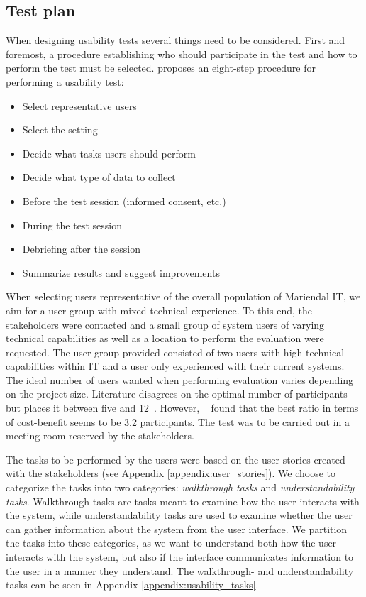 \subsection{Test plan}\label{sec:prototype_test_plan}
When designing usability tests several things need to be considered.
First and foremost, a procedure establishing who should participate in the test and how to perform the test must be selected.
\citeauthor{lazar2005web} \cite{lazar2005web,researchmethodsinhumancomputerinteraction} proposes an eight-step procedure for performing a usability test:
\begin{itemize}
\item Select representative users
\item Select the setting
\item Decide what tasks users should perform
\item Decide what type of data to collect
\item Before the test session (informed consent, etc.)
\item During the test session
\item Debriefing after the session
\item Summarize results and suggest improvements
\end{itemize}
When selecting users representative of the overall population of Mariendal IT, we aim for a user group with mixed technical experience. 
To this end, the stakeholders were contacted and a small group of system users of varying technical capabilities as well as a location to perform the evaluation were requested. 
The user group provided consisted of two users with high technical capabilities within IT and a user only experienced with their current systems.
The ideal number of users wanted when performing evaluation varies depending on the project size\cite{NielsenLandauer1993}. 
Literature disagrees on the optimal number of participants but places it between five\cite{virzi_HowManySubjectsIsEnough} and 12~\cite{Hwang_PeopleRequiredForUsabilityEvaluation}.
However, \citeauthor{NielsenLandauer1993}~\cite{NielsenLandauer1993} found that the best ratio in terms of cost-benefit seems to be 3.2 participants.  
The test was to be carried out in a meeting room reserved by the stakeholders. 

The tasks to be performed by the users were based on the user stories created with the stakeholders (see Appendix \ref{appendix:user_stories}).
We choose to categorize the tasks into two categories: \textit{walkthrough tasks} and \textit{understandability tasks}.
Walkthrough tasks are tasks meant to examine how the user interacts with the system, while understandability tasks are used to examine whether the user can gather information about the system from the user interface. 
We partition the tasks into these categories, as we want to understand both how the user interacts with the system, but also if the interface communicates information to the user in a manner they understand.
The walkthrough- and understandability tasks can be seen in Appendix \ref{appendix:usability_tasks}.

